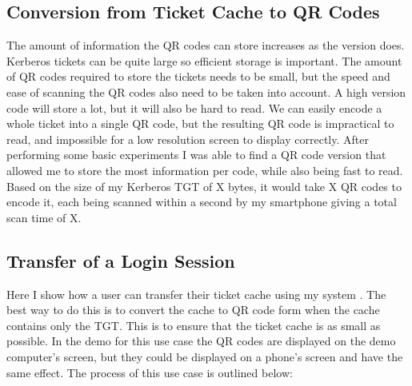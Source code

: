 \documentclass[]{report}   %
\begin{document}
\subsection{Conversion from Ticket Cache to QR Codes}
The amount of information the QR codes can store increases as the version does. Kerberos tickets can be quite large so efficient storage is important. The amount of QR codes required to store the tickets needs to be small, but the speed and ease of scanning the QR codes also need to be taken into account. A high version code will store a lot, but it will also be hard to read. We can easily encode a whole ticket into a single QR code, but the resulting QR code is impractical to read, and impossible for a low resolution screen to display correctly. After performing some basic experiments I was able to find a QR code version that allowed me to store the most information per code, while also being fast to read. Based on the size of my Kerberos TGT of X bytes, it would take X QR codes to encode it, each being scanned within a second by my smartphone giving a total scan time of X.


\subsection{Transfer of a Login Session}
Here I show how a user can transfer their ticket cache using my system \footnotemark. The best way to do this is to convert the cache to QR code form when the cache contains only the TGT. This is to ensure that the ticket cache is as small as possible. In the demo for this use case the QR codes are displayed on the demo computer's screen, but they could be displayed on a phone's screen and have the same effect. The process of this use case is outlined below:

\end{document}
